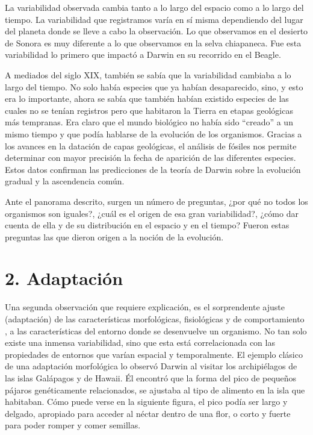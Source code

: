 \documentclass[
  letterpaper,
]{book}
\begin{document}
La variabilidad observada cambia tanto a lo largo del espacio como a lo
largo del tiempo. La variabilidad que registramos varía en sí misma
dependiendo del lugar del planeta donde se lleve a cabo la observación.
Lo que observamos en el desierto de Sonora es muy diferente a lo que
observamos en la selva chiapaneca. Fue esta variabilidad lo primero que
impactó a Darwin en su recorrido en el Beagle.

A mediados del siglo XIX, también se sabía que la variabilidad cambiaba
a lo largo del tiempo. No solo había especies que ya habían
desaparecido, sino, y esto era lo importante, ahora se sabía que también
habían existido especies de las cuales no se tenían registros pero que
habitaron la Tierra en etapas geológicas más tempranas. Era claro que el
mundo biológico no había sido ``creado'' a un mismo tiempo y que podía
hablarse de la evolución de los organismos. Gracias a los avances en la
datación de capas geológicas, el análisis de fósiles nos permite
determinar con mayor precisión la fecha de aparición de las diferentes
especies. Estos datos confirman las predicciones de la teoría de Darwin
sobre la evolución gradual y la ascendencia común.

Ante el panorama descrito, surgen un número de preguntas, ¿por qué no
todos los organismos son iguales?, ¿cuál es el origen de esa gran
variabilidad?, ¿cómo dar cuenta de ella y de su distribución en el
espacio y en el tiempo? Fueron estas preguntas las que dieron origen a
la noción de la evolución.

\section{2. Adaptación}\label{adaptaciuxf3n}

Una segunda observación que requiere explicación, es el sorprendente
ajuste (adaptación) de las características morfológicas, fisiológicas y
de comportamiento , a las características del entorno donde se
desenvuelve un organismo. No tan solo existe una inmensa variabilidad,
sino que esta está correlacionada con las propiedades de entornos que
varían espacial y temporalmente. El ejemplo clásico de una adaptación
morfológica lo observó Darwin al visitar los archipiélagos de las islas
Galápagos y de Hawaii. Él encontró que la forma del pico de pequeños
pájaros genéticamente relacionados, se ajustaba al tipo de alimento en
la isla que habitaban. Cómo puede verse en la siguiente figura, el pico
podía ser largo y delgado, apropiado para acceder al néctar dentro de
una flor, o corto y fuerte para poder romper y comer semillas.
\end{document}
